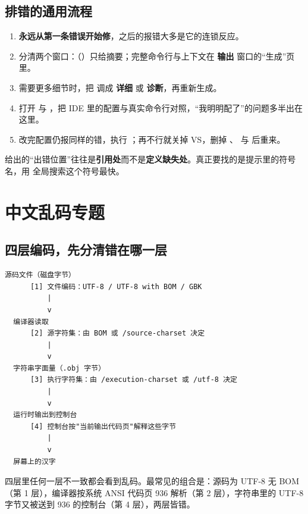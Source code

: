 \subsection{排错的通用流程}
\begin{enumerate}
  \item \textbf{永远从第一条错误开始修}，之后的报错大多是它的连锁反应。
  \item 分清两个窗口：（）只给摘要；完整命令行与上下文在 \textbf{输出} 窗口的“生成”页里。
  \item 需要更多细节时，把  调成 \textbf{详细} 或 \textbf{诊断}，再重新生成。
  \item 打开  与 ，把 IDE 里的配置与真实命令行对照，“我明明配了”的问题多半出在这里。
  \item 改完配置仍报同样的错，执行 ；再不行就关掉 VS，删掉 、 与  后重来。
\end{enumerate}
\begin{tipbox}[提示]
 给出的“出错位置”往往是\textbf{引用处}而不是\textbf{定义缺失处}。真正要找的是提示里的符号名，用  全局搜索这个符号最快。
\end{tipbox}
\section{中文乱码专题}
\subsection{四层编码，先分清错在哪一层}
\begin{lstlisting}[style=textstyle]
  源码文件（磁盘字节）
      [1] 文件编码：UTF-8 / UTF-8 with BOM / GBK
          |
          v
  编译器读取
      [2] 源字符集：由 BOM 或 /source-charset 决定
          |
          v
  字符串字面量（.obj 字节）
      [3] 执行字符集：由 /execution-charset 或 /utf-8 决定
          |
          v
  运行时输出到控制台
      [4] 控制台按"当前输出代码页"解释这些字节
          |
          v
  屏幕上的汉字
\end{lstlisting}
四层里任何一层不一致都会看到乱码。最常见的组合是：源码为 UTF-8 无 BOM（第 1 层），编译器按系统 ANSI 代码页 936 解析（第 2 层），字符串里的 UTF-8 字节又被送到 936 的控制台（第 4 层），两层皆错。
